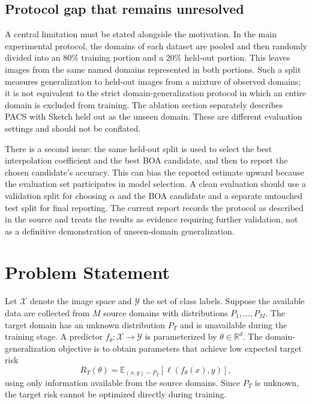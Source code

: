 \documentclass[11pt,a4paper]{article}
\newcommand{\R}{\mathbb{R}}
\newcommand{\E}{\mathbb{E}}
\begin{document}
\subsection{Protocol gap that remains unresolved}
A central limitation must be stated alongside the motivation. In the main experimental protocol, the domains of each dataset are pooled and then randomly divided into an 80\% training portion and a 20\% held-out portion. This leaves images from the same named domains represented in both portions. Such a split measures generalization to held-out images from a mixture of observed domains; it is not equivalent to the strict domain-generalization protocol in which an entire domain is excluded from training. The ablation section separately describes PACS with Sketch held out as the unseen domain. These are different evaluation settings and should not be conflated.

There is a second issue: the same held-out split is used to select the best interpolation coefficient and the best BOA candidate, and then to report the chosen candidate's accuracy. This can bias the reported estimate upward because the evaluation set participates in model selection. A clean evaluation should use a validation split for choosing $\alpha$ and the BOA candidate and a separate untouched test split for final reporting. The current report records the protocol as described in the source and treats the results as evidence requiring further validation, not as a definitive demonstration of unseen-domain generalization.

\section{Problem Statement}

Let $\mathcal{X}$ denote the image space and $\mathcal{Y}$ the set of class labels. Suppose the available data are collected from $M$ source domains with distributions $P_1,\ldots,P_M$. The target domain has an unknown distribution $P_T$ and is unavailable during the training stage. A predictor $f_\theta:\mathcal{X}\rightarrow\mathcal{Y}$ is parameterized by $\theta\in\R^d$. The domain-generalization objective is to obtain parameters that achieve low expected target risk
\begin{equation}
 R_T(\theta)=\E_{(x,y)\sim P_T}\left[\ell(f_\theta(x),y)\right],
 \label{eq:target_risk}
\end{equation}
using only information available from the source domains. Since $P_T$ is unknown, the target risk cannot be optimized directly during training.
\end{document}
